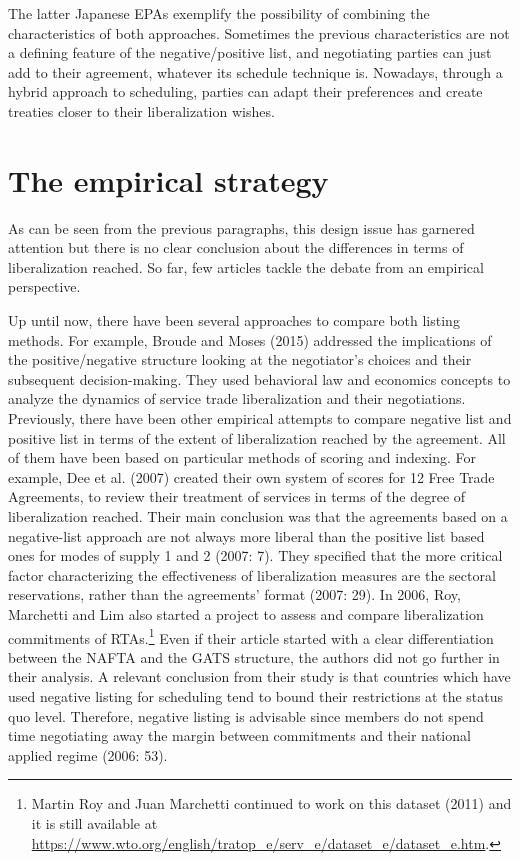 \documentclass{article}
\begin{document}
\smallskip

The latter Japanese EPAs exemplify the possibility of combining the characteristics of both approaches. Sometimes the previous characteristics are not a defining feature of the negative/positive list, and negotiating parties can just add to their agreement, whatever its schedule technique is. Nowadays, through a hybrid approach to scheduling, parties can adapt their preferences and create treaties closer to their liberalization wishes.


\section{The empirical strategy}

As can be seen from the previous paragraphs, this design issue has garnered attention but there is no clear conclusion about the differences in terms of liberalization reached. So far, few articles tackle the debate from an empirical perspective.

\smallskip

Up until now, there have been several approaches to compare both listing methods. For example, Broude and Moses (2015) addressed the implications of the positive/negative structure looking at the negotiator’s choices and their subsequent decision-making. They used behavioral law and economics concepts to analyze the dynamics of service trade liberalization and their negotiations. Previously, there have been other empirical attempts to compare negative list and positive list in terms of the extent of liberalization reached by the agreement. All of them have been based on particular methods of scoring and indexing. For example, Dee et al. (2007) created their own system of scores for 12 Free Trade Agreements, to review their treatment of services in terms of the degree of liberalization reached. Their main conclusion was that the agreements based on a negative-list approach are not always more liberal than the positive list based ones for modes of supply 1 and 2 (2007: 7). They specified that the more critical factor characterizing the effectiveness of liberalization measures are the sectoral reservations, rather than the agreements’ format (2007: 29). In 2006, Roy, Marchetti and Lim also started a project to assess and compare liberalization commitments of RTAs.\footnote{Martin Roy and Juan Marchetti continued to work on this dataset (2011) and it is still available at
\url{https://www.wto.org/english/tratop_e/serv_e/dataset_e/dataset_e.htm}.} Even if their article started with a clear differentiation between the NAFTA and the GATS structure, the authors did not go further in their analysis. A relevant conclusion from their study is that countries which have used negative listing for scheduling tend to bound their restrictions at the status quo level. Therefore, negative listing is advisable since members do not spend time negotiating away the margin between commitments and their national applied regime (2006: 53).
\end{document}
